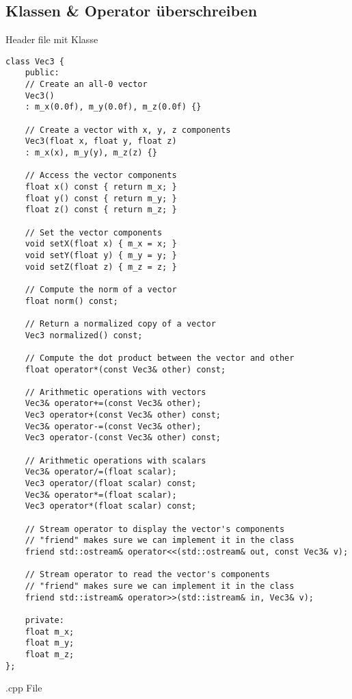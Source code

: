 \subsection{Klassen \& Operator überschreiben}
Header file mit Klasse
\begin{lstlisting}
class Vec3 {
	public:
	// Create an all-0 vector
	Vec3() 
	: m_x(0.0f), m_y(0.0f), m_z(0.0f) {}
	
	// Create a vector with x, y, z components
	Vec3(float x, float y, float z) 
	: m_x(x), m_y(y), m_z(z) {}
	
	// Access the vector components  
	float x() const { return m_x; }
	float y() const { return m_y; }
	float z() const { return m_z; }
	
	// Set the vector components
	void setX(float x) { m_x = x; }
	void setY(float y) { m_y = y; }
	void setZ(float z) { m_z = z; }
	
	// Compute the norm of a vector
	float norm() const;
	
	// Return a normalized copy of a vector
	Vec3 normalized() const;
	
	// Compute the dot product between the vector and other
	float operator*(const Vec3& other) const;
	
	// Arithmetic operations with vectors
	Vec3& operator+=(const Vec3& other);
	Vec3 operator+(const Vec3& other) const;
	Vec3& operator-=(const Vec3& other);
	Vec3 operator-(const Vec3& other) const;
	
	// Arithmetic operations with scalars
	Vec3& operator/=(float scalar);
	Vec3 operator/(float scalar) const;
	Vec3& operator*=(float scalar);
	Vec3 operator*(float scalar) const;
	
	// Stream operator to display the vector's components
	// "friend" makes sure we can implement it in the class
	friend std::ostream& operator<<(std::ostream& out, const Vec3& v);
	
	// Stream operator to read the vector's components
	// "friend" makes sure we can implement it in the class
	friend std::istream& operator>>(std::istream& in, Vec3& v);
	
	private:
	float m_x;
	float m_y;
	float m_z;
};
\end{lstlisting}
.cpp File

